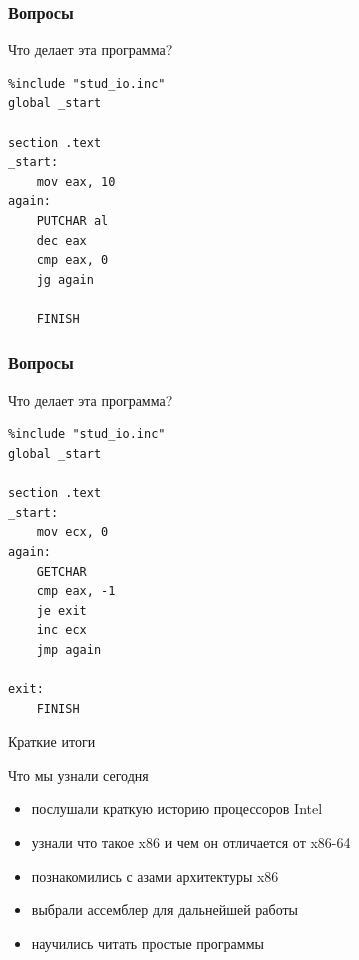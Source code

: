 \documentclass{beamer}
\begin{document}
    \begin{frame}[fragile]
        \frametitle{Вопросы}
        \begin{block}{Что делает эта программа?}
        \begin{verbatim}
%include "stud_io.inc"
global _start

section .text
_start:
    mov eax, 10
again:
    PUTCHAR al
    dec eax
    cmp eax, 0
    jg again

    FINISH
        \end{verbatim}
        \end{block}
\end{frame}
    \begin{frame}[fragile]
        \frametitle{Вопросы}
        \begin{block}{Что делает эта программа?}
        \begin{verbatim}
%include "stud_io.inc"
global _start

section .text
_start:
    mov ecx, 0
again:
    GETCHAR
    cmp eax, -1
    je exit
    inc ecx
    jmp again
    
exit:
    FINISH
        \end{verbatim}
        \end{block}
\end{frame}
    \begin{frame}{Краткие итоги}
        \begin{block}{Что мы узнали сегодня}
        \begin{itemize}
            \item послушали краткую историю процессоров Intel
            \item узнали что такое x86 и чем он отличается от x86-64
            \item познакомились с азами архитектуры x86
            \item выбрали ассемблер для дальнейшей работы
            \item научились читать простые программы
        \end{itemize}
        \end{block}
    \end{frame}
\end{document}
